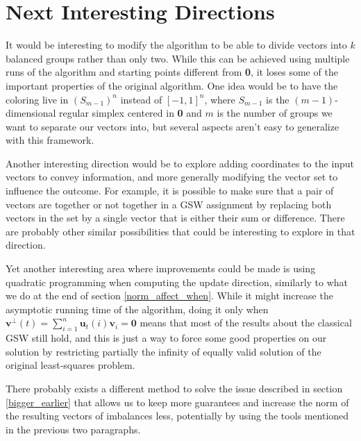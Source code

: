 \documentclass[12pt]{article}
\begin{document}

\section{Next Interesting Directions}
It would be interesting to modify the algorithm to be able to divide vectors into $k$ balanced groups rather than only two. While this can be achieved using multiple runs of the algorithm and starting points different from \textbf{0}, it loses some of the important properties of the original algorithm. One idea would be to have the coloring live in $(S_{m-1})^n$ instead of $[-1,1]^n$, where $S_{m-1}$ is  the $(m-1)$-dimensional regular simplex centered in \textbf{0} and $m$ is the number of groups we want to separate our vectors into, but several aspects aren't easy to generalize with this framework.

Another interesting direction would be to explore adding coordinates to the input vectors to convey information, and more generally modifying the vector set to influence the outcome. For example, it is possible to make sure that a pair of vectors are together or not together in a GSW assignment by replacing both vectors in the set by a single vector that is either their sum or difference. There are probably other similar possibilities that could be interesting to explore in that direction.

Yet another interesting area where improvements could be made is using quadratic programming when computing the update direction, similarly to what we do at the end of section \ref{norm_affect_when}. While it might increase the asymptotic running time of the algorithm, doing it only when $\textbf{v}^\perp(t)=\sum_{i=1}^n\textbf{u}_t(i)\textbf{v}_i=\textbf{0}$ means that most of the results about the classical GSW still hold, and this is just a way to force some good properties on our solution by restricting partially the infinity of equally valid solution of the original least-squares problem.

There probably exists a different method to solve the issue described in section \ref{bigger_earlier} that allows us to keep more guarantees and increase the norm of the resulting vectors of imbalances less, potentially by using the tools mentioned in the previous two paragraphs.
\end{document}
